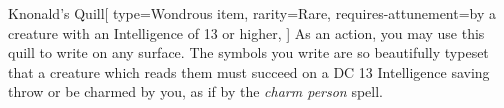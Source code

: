 \documentclass[theme=dnd]{rpgcard}
\begin{document}
	\begin{RpgItem}{Knonald's Quill}[
			type={Wondrous item},
			rarity=Rare,
			requires-attunement={by a creature with an Intelligence of 13 or higher},
		]
		As an action, you may use this quill to write on any surface. The symbols you write are so beautifully typeset that a creature which reads them must succeed on a DC 13 Intelligence saving throw or be charmed by you, as if by the \textit{charm person} spell.
	\end{RpgItem}
\end{document}
